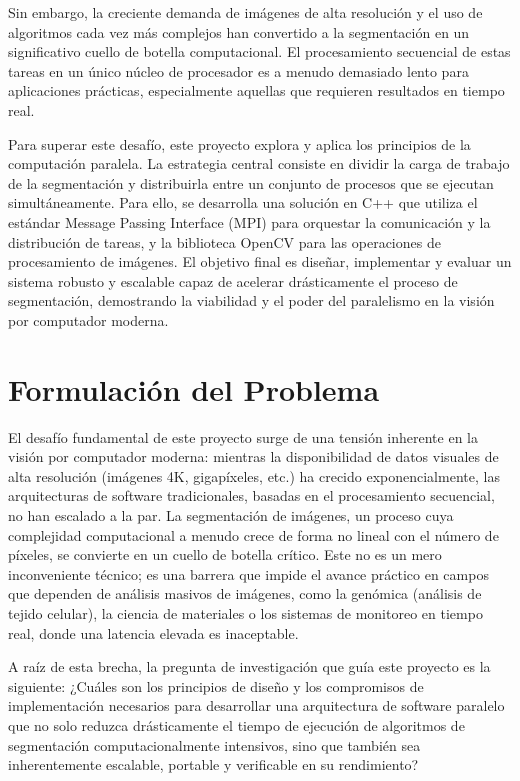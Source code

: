 \documentclass[fleqn,10pt]{article}
\begin{document}
Sin embargo, la creciente demanda de imágenes de alta resolución y el uso de algoritmos cada vez más complejos han convertido a la segmentación en un significativo cuello de botella computacional. El procesamiento secuencial de estas tareas en un único núcleo de procesador es a menudo demasiado lento para aplicaciones prácticas, especialmente aquellas que requieren resultados en tiempo real.

Para superar este desafío, este proyecto explora y aplica los principios de la computación paralela. La estrategia central consiste en dividir la carga de trabajo de la segmentación y distribuirla entre un conjunto de procesos que se ejecutan simultáneamente. Para ello, se desarrolla una solución en C++ que utiliza el estándar Message Passing Interface (MPI) para orquestar la comunicación y la distribución de tareas, y la biblioteca OpenCV para las operaciones de procesamiento de imágenes. El objetivo final es diseñar, implementar y evaluar un sistema robusto y escalable capaz de acelerar drásticamente el proceso de segmentación, demostrando la viabilidad y el poder del paralelismo en la visión por computador moderna.

\clearpage
\section{Formulación del Problema}
El desafío fundamental de este proyecto surge de una tensión inherente en la visión por computador moderna: mientras la disponibilidad de datos visuales de alta resolución (imágenes 4K, gigapíxeles, etc.) ha crecido exponencialmente, las arquitecturas de software tradicionales, basadas en el procesamiento secuencial, no han escalado a la par. La segmentación de imágenes, un proceso cuya complejidad computacional a menudo crece de forma no lineal con el número de píxeles, se convierte en un cuello de botella crítico. Este no es un mero inconveniente técnico; es una barrera que impide el avance práctico en campos que dependen de análisis masivos de imágenes, como la genómica (análisis de tejido celular), la ciencia de materiales o los sistemas de monitoreo en tiempo real, donde una latencia elevada es inaceptable.

A raíz de esta brecha, la pregunta de investigación que guía este proyecto es la siguiente:
¿Cuáles son los principios de diseño y los compromisos de implementación necesarios para desarrollar una arquitectura de software paralelo que no solo reduzca drásticamente el tiempo de ejecución de algoritmos de segmentación computacionalmente intensivos, sino que también sea inherentemente escalable, portable y verificable en su rendimiento?
\end{document}
